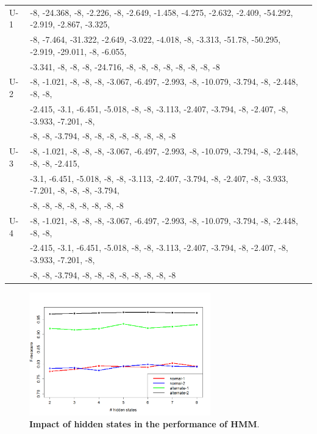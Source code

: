 \documentclass{amia}
\begin{document}
\begin{table}[h]
\begin{tabular}{|l|l|}
U-1 & -8, -24.368, -8, -2.226, -8, -2.649, -1.458, -4.275, -2.632, -2.409, -54.292, -2.919, -2.867, -3.325, \\
& -8, -7.464, -31.322, -2.649, -3.022, -4.018, -8, -3.313, -51.78, -50.295, -2.919, -29.011, -8, -6.055, \\
& -3.341, -8, -8, -8, -24.716, -8, -8, -8, -8, -8, -8, -8, -8  \\\hline
U-2 & -8, -1.021, -8, -8, -8, -3.067, -6.497, -2.993, -8, -10.079, -3.794, -8, -2.448, -8, -8, \\
& -2.415, -3.1, -6.451, -5.018, -8, -8, -3.113, -2.407, -3.794, -8, -2.407, -8, -3.933, -7.201, -8, \\
& -8, -8, -3.794, -8, -8, -8, -8, -8, -8, -8, -8 \\\hline
U-3 & -8, -1.021, -8, -8, -8, -3.067, -6.497, -2.993, -8, -10.079, -3.794, -8, -2.448, -8, -8, -2.415, \\
& -3.1, -6.451, -5.018, -8, -8, -3.113, -2.407, -3.794, -8, -2.407, -8, -3.933, -7.201, -8, -8, -8, -3.794, \\
& -8, -8, -8, -8, -8, -8, -8, -8 \\\hline
U-4 & -8, -1.021, -8, -8, -8, -3.067, -6.497, -2.993, -8, -10.079, -3.794, -8, -2.448, -8, -8, \\
& -2.415, -3.1, -6.451, -5.018, -8, -8, -3.113, -2.407, -3.794, -8, -2.407, -8, -3.933, -7.201, -8, \\
& -8, -8, -3.794, -8, -8, -8, -8, -8, -8, -8, -8 \\\hline


  \end{tabular}
\end{table} 

\begin{figure}[htb!]
    \centering
    \includegraphics[width=0.70\textwidth]{figures/hidden-states.png}
    \caption{\textbf{Impact of hidden states in the performance of HMM}.}
    \label{fig:hidden-states}
\end{figure}
\end{document}

